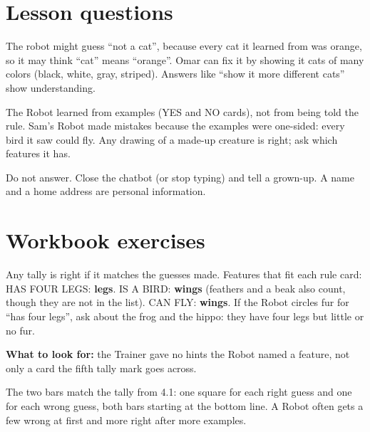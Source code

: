 
\section{Lesson questions}
\begin{answer}
The robot might guess \enquote{not a cat}, because every cat it learned from was orange, so it may think \enquote{cat} means \enquote{orange}. Omar can fix it by showing it cats of many colors (black, white, gray, striped). Answers like \enquote{show it more different cats} show understanding.
\end{answer}

\begin{answer}[Reflection]
The Robot learned from examples (YES and NO cards), not from being told the rule. Sam's Robot made mistakes because the examples were one-sided: every bird it saw could fly. Any drawing of a made-up creature is right; ask which features it has.
\end{answer}

\begin{answer}
Do not answer. Close the chatbot (or stop typing) and tell a grown-up. A name and a home address are personal information.
\end{answer}

\section{Workbook exercises}
\begin{answer}
Any tally is right if it matches the guesses made. Features that fit each rule card: HAS FOUR LEGS: \textbf{legs}. IS A BIRD: \textbf{wings} (feathers and a beak also count, though they are not in the list). CAN FLY: \textbf{wings}. If the Robot circles fur for \enquote{has four legs}, ask about the frog and the hippo: they have four legs but little or no fur.

\textbf{What to look for:} \tickbox{} the Trainer gave no hints \quad \tickbox{} the Robot named a feature, not only a card \quad \tickbox{} the fifth tally mark goes across.
\end{answer}

\begin{answer}
The two bars match the tally from 4.1: one square for each right guess and one for each wrong guess, both bars starting at the bottom line. A Robot often gets a few wrong at first and more right after more examples.
\end{answer}

